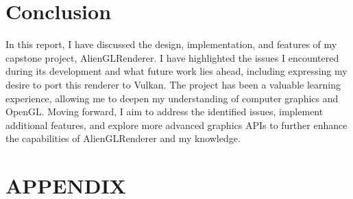 \documentclass[letterpaper, 10 pt, conference]{ieeeconf}  %
\begin{document}
\section {Conclusion}
In this report, I have discussed the design, implementation, and features of my capstone project, AlienGLRenderer. I have highlighted the issues I encountered during its development and what future work lies ahead, including expressing my desire to port this renderer to Vulkan. The project has been a valuable learning experience, allowing me to deepen my understanding of computer graphics and OpenGL. Moving forward, I aim to address the identified issues, implement additional features, and explore more advanced graphics APIs to further enhance the capabilities of AlienGLRenderer and my knowledge.

\section*{APPENDIX}
\end{document}

